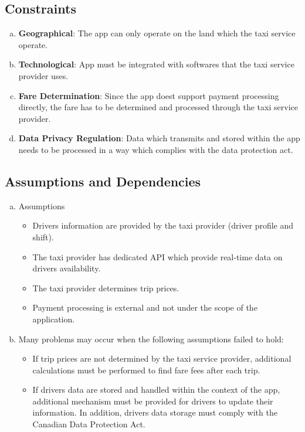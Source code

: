 \documentclass[]{article}
\begin{document}

\subsection{Constraints}
\label{sub:constraints}
\begin{enumerate}[a)]
	\item \textbf{Geographical}: The app can only operate on the land which the taxi service operate.
	\item \textbf{Technological}: App must be integrated with softwares that the taxi service provider uses.
	\item \textbf{Fare Determination}: Since the app does\textquotesingle t support payment processing directly, the fare has to be determined and processed through the taxi service provider.
	\item \textbf{Data Privacy Regulation}: Data which transmits and stored within the app needs to be processed in a way which complies with the data protection act.

\end{enumerate}


\subsection{Assumptions and Dependencies}
\label{sub:assumptions_and_dependencies}


\begin{enumerate}[a)]
	\item Assumptions

	\begin{itemize}
		\item Drivers information are provided by the taxi provider (driver profile and shift).
		\item The taxi provider has dedicated API which provide real-time data on driver\textquotesingle s availability.
		\item The taxi provider determines trip prices.
		\item Payment processing is external and not under the scope of the application.

	\end{itemize}

	\item Many problems may occur when the following assumptions failed to hold:
	\begin{itemize}
		\item If trip prices are not determined by the taxi service provider, additional calculations must be performed to find fare fees after each trip.
		\item If drivers data are stored and handled within the context of the app, additional mechanism must be provided for drivers to update their information. In addition, driver\textquotesingle s data storage must comply with the Canadian Data Protection Act. 


	\end{itemize}
\end{enumerate}
\end{document}
